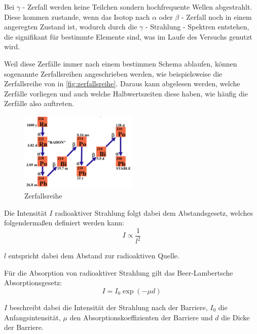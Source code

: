 \documentclass[12pt,english,ngerman]{scrartcl}
\begin{document}
Bei \(\gamma\) - Zerfall werden keine Teilchen sondern hochfrequente Wellen
abgestrahlt. Diese kommen zustande, wenn das Isotop nach \(\alpha\) oder
\(\beta\) - Zerfall noch in einem angeregten Zustand ist, wodurch durch die
\(\gamma\) - Strahlung - Spektren entstehen, die signifikant für bestimmte
Elemente sind, was im Laufe des Versuchs genutzt wird.

Weil diese Zerfälle immer nach einem bestimmen Schema ablaufen, können
sogenannte Zerfallsreihen angeschrieben werden, wie beispielsweise die
Zerfallsreihe von  in \autoref{fig:zerfallsreihe}. Daraus
kann abgelesen werden, welche Zerfälle vorliegen und auch welche
Halbwertszeiten diese haben, wie häufig die Zerfälle also auftreten.

\begin{figure}[H]
	\begin{center}
		\includegraphics[width = 0.5\textwidth]{./figures/zerfallsreihe.png}

	\end{center}
	\caption{Zerfallsreihe ~\cite[]{}}
	\label{fig:zerfallsreihe}

\end{figure}

Die Intensität \(I\) radioaktiver Strahlung folgt dabei dem Abstandsgesetz,
welches folgendermaßen definiert werden kann:
\begin{equation}
	I \propto \frac{1}{l^2}
	\label{eq:abstandsgesetz}
\end{equation}

\(l\) entspricht dabei dem Abstand zur radioaktiven Quelle.

Für die Absorption von radioaktiver Strahlung gilt das Beer-Lambertsche
Absorptionsgesetz:
\begin{equation}
	I = I_0 \exp(-\mu d)
	\label{eq:beerschesgesetzt}
\end{equation}

\(I\) beschreibt dabei die Intensität der Strahlung nach der Barriere, \(I_0\)
die Anfangsintensität, \(\mu\) den Absorptionskoeffizienten der Barriere und
\(d\) die Dicke der Barriere.
\end{document}
